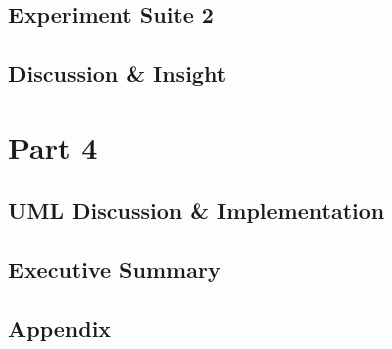 \documentclass{article}
\begin{document}
\subsection{Experiment Suite 2}
\subsection{Discussion \& Insight}


\newpage
\section{Part 4}
\subsection{UML Discussion \& Implementation}

\newpage
\subsection{Executive Summary}

\newpage
\subsection{Appendix}
\end{document}
